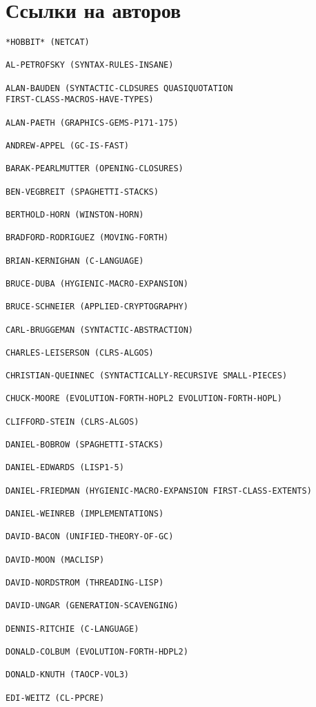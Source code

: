 \chapter*{Ссылки на авторов}

\begin{verbatim}
*HOBBIT* (NETCAT)

AL-PETROFSKY (SYNTAX-RULES-INSANE)

ALAN-BAUDEN (SYNTACTIC-CLDSURES QUASIQUOTATION
FIRST-CLASS-MACROS-HAVE-TYPES)

ALAN-PAETH (GRAPHICS-GEMS-P171-175)

ANDREW-APPEL (GC-IS-FAST)

BARAK-PEARLMUTTER (OPENING-CLOSURES)

BEN-VEGBREIT (SPAGHETTI-STACKS)

BERTHOLD-HORN (WINSTON-HORN)

BRADFORD-RODRIGUEZ (MOVING-FORTH)

BRIAN-KERNIGHAN (C-LANGUAGE)

BRUCE-DUBA (HYGIENIC-MACRO-EXPANSION)

BRUCE-SCHNEIER (APPLIED-CRYPTOGRAPHY)

CARL-BRUGGEMAN (SYNTACTIC-ABSTRACTION)

CHARLES-LEISERSON (CLRS-ALGOS)

CHRISTIAN-QUEINNEC (SYNTACTICALLY-RECURSIVE SMALL-PIECES)

CHUCK-MOORE (EVOLUTION-FORTH-HOPL2 EVOLUTION-FORTH-HOPL)

CLIFFORD-STEIN (CLRS-ALGOS)

DANIEL-BOBROW (SPAGHETTI-STACKS)

DANIEL-EDWARDS (LISP1-5)

DANIEL-FRIEDMAN (HYGIENIC-MACRO-EXPANSION FIRST-CLASS-EXTENTS)

DANIEL-WEINREB (IMPLEMENTATIONS)

DAVID-BACON (UNIFIED-THEORY-OF-GC)

DAVID-MOON (MACLISP)

DAVID-NORDSTROM (THREADING-LISP)

DAVID-UNGAR (GENERATION-SCAVENGING)

DENNIS-RITCHIE (C-LANGUAGE)

DONALD-COLBUM (EVOLUTION-FORTH-HDPL2)

DONALD-KNUTH (TAOCP-VOL3)

EDI-WEITZ (CL-PPCRE)


\end{verbatim}
